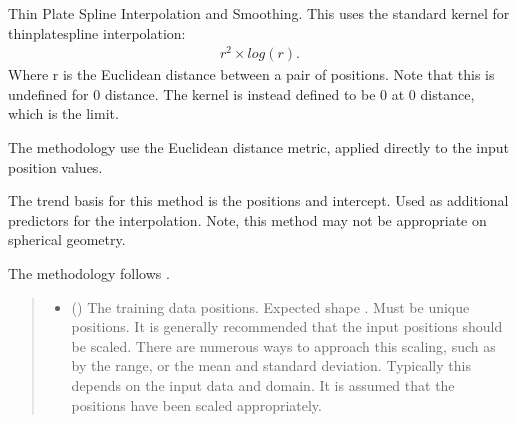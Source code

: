 \documentclass[letterpaper,10pt,english]{sphinxmanual}
\begin{document}
\begin{fulllineitems}
\label{\detokenize{splines:glomar_gridding.spline.ThinPlateSpline}}
\pysigstartsignatures
\pysiglinewithargsret
{}
{\sphinxparamcomma {}\sphinxparamcomma {}\sphinxparamcomma {}}
{}
\pysigstopsignatures
\sphinxAtStartPar
Thin Plate Spline Interpolation and Smoothing. This uses the standard kernel
for thin\sphinxhyphen{}plate\sphinxhyphen{}spline interpolation:
\begin{equation*}
\begin{split}r^2 \times log(r).\end{split}
\end{equation*}
\sphinxAtStartPar
Where r is the Euclidean distance between a pair of positions. Note that
this is undefined for 0 distance. The kernel is instead defined to be 0 at 0
distance, which is the limit.

\sphinxAtStartPar
The methodology use the Euclidean distance metric, applied directly to the
input position values.

\sphinxAtStartPar
The trend basis for this method is the positions and intercept. Used as
additional predictors for the interpolation. Note, this method may not be
appropriate on spherical geometry.

\sphinxAtStartPar
The methodology follows .
\begin{quote}\begin{description}
\begin{itemize}
\item {}
\sphinxAtStartPar
{} () \textendash{} The training data positions. Expected shape .
Must be unique positions. It is generally recommended that the input
positions should be scaled. There are numerous ways to approach this
scaling, such as by the range, or the mean and standard deviation.
Typically this depends on the input data and domain. It is assumed that
the positions have been scaled appropriately.


\end{itemize}
\end{description}
\end{quote}
\end{fulllineitems}
\end{document}

